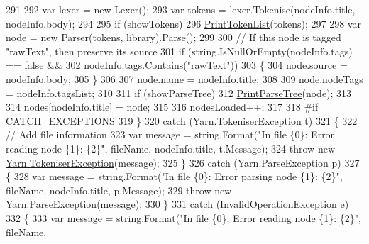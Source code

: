 \begin{DoxyCode}
291 
292                         var lexer = \textcolor{keyword}{new} Lexer();
293                         var tokens = lexer.Tokenise(nodeInfo.title, nodeInfo.body);
294 
295                         \textcolor{keywordflow}{if} (showTokens)
296                             \hyperlink{a00123_a9321fce224021841ce6f70ca7fbe531b}{PrintTokenList}(tokens);
297 
298                         var node = \textcolor{keyword}{new} Parser(tokens, library).Parse();
299 
300                         \textcolor{comment}{// If this node is tagged "rawText", then preserve its source}
301                         \textcolor{keywordflow}{if} (\textcolor{keywordtype}{string}.IsNullOrEmpty(nodeInfo.tags) == \textcolor{keyword}{false} &&
302                             nodeInfo.tags.Contains(\textcolor{stringliteral}{"rawText"}))
303                         \{
304                             node.source = nodeInfo.body;
305                         \}
306 
307                         node.name = nodeInfo.title;
308 
309                         node.nodeTags = nodeInfo.tagsList;
310 
311                         \textcolor{keywordflow}{if} (showParseTree)
312                             \hyperlink{a00123_aa105ea8e5d65a420d1089616523feecc}{PrintParseTree}(node);
313 
314                         nodes[nodeInfo.title] = node;
315 
316                         nodesLoaded++;
317 
318 \textcolor{preprocessor}{#if CATCH\_EXCEPTIONS}
319 \textcolor{preprocessor}{}                    \}
320                     \textcolor{keywordflow}{catch} (Yarn.TokeniserException t)
321                     \{
322                         \textcolor{comment}{// Add file information}
323                         var message = string.Format(\textcolor{stringliteral}{"In file \{0\}: Error reading node \{1\}: \{2\}"}, fileName, 
      nodeInfo.title, t.Message);
324                         \textcolor{keywordflow}{throw} \textcolor{keyword}{new} \hyperlink{a00164}{Yarn.TokeniserException}(message);
325                     \}
326                     \textcolor{keywordflow}{catch} (Yarn.ParseException p)
327                     \{
328                         var message = string.Format(\textcolor{stringliteral}{"In file \{0\}: Error parsing node \{1\}: \{2\}"}, fileName, 
      nodeInfo.title, p.Message);
329                         \textcolor{keywordflow}{throw} \textcolor{keyword}{new} \hyperlink{a00137}{Yarn.ParseException}(message);
330                     \}
331                     \textcolor{keywordflow}{catch} (InvalidOperationException e)
332                     \{
333                         var message = string.Format(\textcolor{stringliteral}{"In file \{0\}: Error reading node \{1\}: \{2\}"}, fileName, 

\end{DoxyCode}
